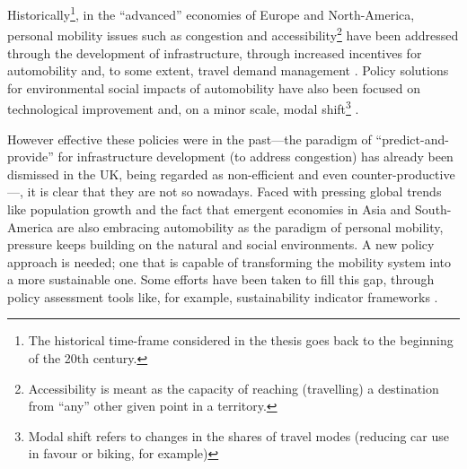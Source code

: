 Historically\footnote{The historical time-frame considered in the thesis goes back to the beginning of the 20th century.}, in the ``advanced'' economies of Europe and North-America, personal mobility issues such as congestion and accessibility\footnote{Accessibility is meant as the capacity of reaching (travelling) a destination from ``any'' other given point in a territory.} have been addressed through the development of infrastructure, through increased incentives for automobility and, to some extent, travel demand management \parencite{lyons2012_VisionsFutureNeed}. Policy solutions for environmental social impacts of automobility have also been focused on technological improvement and, on a minor scale, modal shift\footnote{Modal shift refers to changes in the shares of travel modes (reducing car use in favour or biking, for example)} \parencite{koehler2009_transitionsmodelsustainable}.

However effective these policies were in the past---the paradigm of ``predict-and-provide'' for infrastructure development (to address congestion) has already been dismissed in the UK, being regarded as non-efficient and even counter-productive \parencite{goodwin2012_ProvidingRoadCapacity}---, it is clear that they are not so nowadays. Faced with pressing global trends like population growth and the fact that emergent economies in Asia and South-America are also embracing automobility as the paradigm of personal mobility, pressure keeps building on the natural and social environments. A new policy approach is needed; one that is capable of transforming the mobility system into a more sustainable one. Some efforts have been taken to fill this gap, through policy assessment tools like, for example, sustainability indicator frameworks \parencite{castillo2010_ELASTICmethodological,haghshenas2012_Urbansustainabletransportation,litman2007_DevelopingIndicatorsComprehensive,shiau2013_Developingindicatorsystem}.

